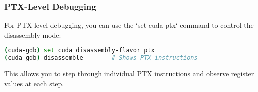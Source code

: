 \subsubsection{PTX-Level Debugging}

For PTX-level debugging, you can use the `set cuda ptx` command to control the disassembly mode:

\begin{lstlisting}[language=bash]
(cuda-gdb) set cuda disassembly-flavor ptx
(cuda-gdb) disassemble        # Shows PTX instructions
\end{lstlisting}

This allows you to step through individual PTX instructions and observe register values at each step.


